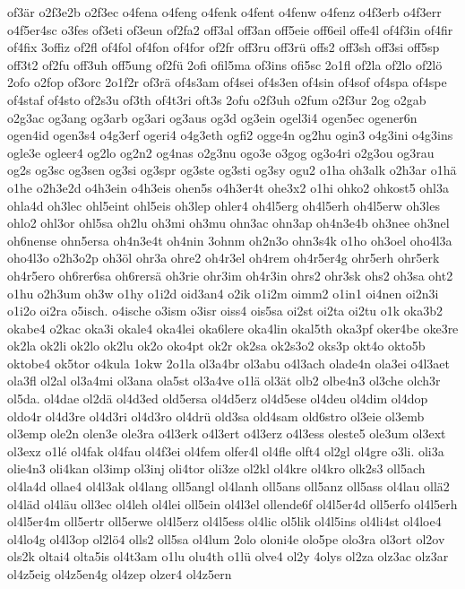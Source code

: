 {of3är
o2f3e2b
o2f3ec
o4fena
o4feng
o4fenk
o4fent
o4fenw
o4fenz
o4f3erb
o4f3err
o4f5er4sc
o3fes
of3eti
of3eun
of2fa2
off3al
off3an
off5eie
off6eil
offe4l
of4f3in
of4fir
of4fix
3offiz
of2fl
of4fol
of4fon
of4for
of2fr
off3ru
off3rü
offs2
off3sh
off3si
off5sp
off3t2
of2fu
off3uh
off5ung
of2fü
2ofi
ofil5ma
of3ins
ofi5sc
2o1fl
of2la
of2lo
of2lö
2ofo
o2fop
of3orc
2o1f2r
of3rä
of4s3am
of4sei
of4s3en
of4sin
of4sof
of4spa
of4spe
of4staf
of4sto
of2s3u
of3th
of4t3ri
oft3s
2ofu
o2f3uh
o2fum
o2f3ur
2og
o2gab
o2g3ac
og3ang
og3arb
og3ari
og3aus
og3d
og3ein
ogel3i4
ogen5ec
ogener6n
ogen4id
ogen3s4
o4g3erf
ogeri4
o4g3eth
ogfi2
ogge4n
og2hu
ogin3
o4g3ini
o4g3ins
ogle3e
ogleer4
og2lo
og2n2
og4nas
o2g3nu
ogo3e
o3gog
og3o4ri
o2g3ou
og3rau
og2s
og3sc
og3sen
og3si
og3spr
og3ste
og3sti
og3sy
ogu2
o1ha
oh3alk
o2h3ar
o1hä
o1he
o2h3e2d
o4h3ein
o4h3eis
ohen5s
o4h3er4t
ohe3x2
o1hi
ohko2
ohkost5
ohl3a
ohla4d
oh3lec
ohl5eint
ohl5eis
oh3lep
ohler4
oh4l5erg
oh4l5erh
oh4l5erw
oh3les
ohlo2
ohl3or
ohl5sa
oh2lu
oh3mi
oh3mu
ohn3ac
ohn3ap
oh4n3e4b
oh3nee
oh3nel
oh6nense
ohn5ersa
oh4n3e4t
oh4nin
3ohnm
oh2n3o
ohn3s4k
o1ho
oh3oel
oho4l3a
oho4l3o
o2h3o2p
oh3öl
ohr3a
ohre2
oh4r3el
oh4rem
oh4r5er4g
ohr5erh
ohr5erk
oh4r5ero
oh6rer6sa
oh6rersä
oh3rie
ohr3im
oh4r3in
ohrs2
ohr3sk
ohs2
oh3sa
oht2
o1hu
o2h3um
oh3w
o1hy
o1i2d
oid3an4
o2ik
o1i2m
oimm2
o1in1
oi4nen
oi2n3i
o1i2o
oi2ra
o5isch.
o4ische
o3ism
o3isr
oiss4
ois5sa
oi2st
oi2ta
oi2tu
o1k
oka3b2
okabe4
o2kac
oka3i
okale4
oka4lei
oka6lere
oka4lin
okal5th
oka3pf
oker4be
oke3re
ok2la
ok2li
ok2lo
ok2lu
ok2o
oko4pt
ok2r
ok2sa
ok2s3o2
oks3p
okt4o
okto5b
oktobe4
ok5tor
o4kula
1okw
2o1la
ol3a4br
ol3abu
o4l3ach
olade4n
ola3ei
o4l3aet
ola3fl
ol2al
ol3a4mi
ol3ana
ola5st
ol3a4ve
o1lä
ol3ät
olb2
olbe4n3
ol3che
olch3r
ol5da.
ol4dae
ol2dä
ol4d3ed
old5ersa
ol4d5erz
ol4d5ese
ol4deu
ol4dim
ol4dop
oldo4r
ol4d3re
ol4d3ri
ol4d3ro
ol4drü
old3sa
old4sam
old6stro
ol3eie
ol3emb
ol3emp
ole2n
olen3e
ole3ra
o4l3erk
o4l3ert
o4l3erz
o4l3ess
oleste5
ole3um
ol3ext
ol3exz
o1lé
ol4fak
ol4fau
ol4f3ei
ol4fem
olfer4l
ol4fle
olft4
ol2gl
ol4gre
o3li.
oli3a
olie4n3
oli4kan
ol3imp
ol3inj
oli4tor
oli3ze
ol2kl
ol4kre
ol4kro
olk2s3
oll5ach
ol4la4d
ollae4
ol4l3ak
ol4lang
oll5angl
ol4lanh
oll5ans
oll5anz
oll5ass
ol4lau
ollä2
ol4läd
ol4läu
oll3ec
ol4leh
ol4lei
oll5ein
ol4l3el
ollende6f
ol4l5er4d
oll5erfo
ol4l5erh
ol4l5er4m
oll5ertr
oll5erwe
ol4l5erz
ol4l5ess
ol4lic
ol5lik
ol4l5ins
ol4li4st
ol4loe4
ol4lo4g
ol4l3op
ol2lö4
olls2
oll5sa
ol4lum
2olo
oloni4e
olo5pe
olo3ra
ol3ort
ol2ov
ols2k
oltai4
olta5is
ol4t3am
o1lu
olu4th
o1lü
olve4
ol2y
4olys
ol2za
olz3ac
olz3ar
ol4z5eig
ol4z5en4g
ol4zep
olzer4
ol4z5ern
}
